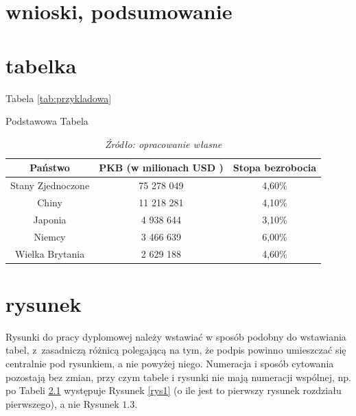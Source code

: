 \documentclass[inzynierska]{pwr_wmat_praca_dyplomowa}
\theoremstyle{plain}
\numberwithin{theorem}{chapter}
\theoremstyle{definition}
\numberwithin{theorem}{chapter}
\begin{document}
\chapter{wnioski, podsumowanie}

\chapter{tabelka}
Tabela \ref{tab:przykladowa} 
\begin{table}[H]
	\caption{Podstawowa Tabela}
	\centering
	\begin{tabular}{ccc}
		\hline
		\hline                       
		Państwo & PKB (w milionach USD )& Stopa bezrobocia  \\  [0.5ex] 
		\hline 
		Stany Zjednoczone & 75 278 049 & 4,60\%  \\
		Chiny & 11 218 281 & 4,10\%   \\
		Japonia & 4 938 644 & 3,10\%  \\
		Niemcy & 3 466 639 & 6,00\%   \\
		Wielka Brytania & 2 629 188 & 4,60\%  \\ [1ex]  
		\hline 
	\end{tabular}
	\caption*{\textit{Źródło: opracowanie własne}}
	\label{tab:przykladowa2} 
\end{table}
\chapter{rysunek}
Rysunki do pracy dyplomowej należy wstawiać w sposób podobny do wstawiania tabel, z~zasadniczą różnicą polegającą na tym, że podpis powinno umieszczać się centralnie pod rysunkiem, a nie powyżej niego. Numeracja i sposób cytowania pozostają bez zmian, przy czym tabele i rysunki nie mają numeracji wspólnej, np. po Tabeli \ref{tab:przykladowa2} występuje Rysunek \ref{rys1} (o ile jest to pierwszy rysunek rozdziału pierwszego), a nie Rysunek $1.3$.
\end{document}
